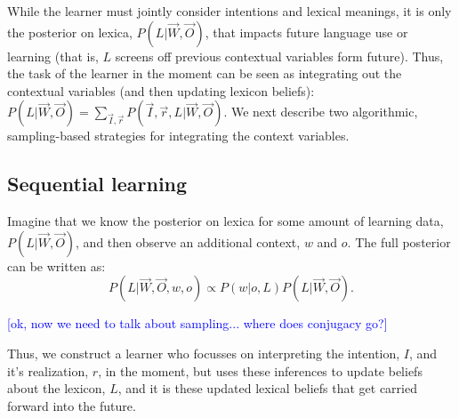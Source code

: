 \documentclass[man,noapacite,12pt]{apa2}
\newcommand{\nnote}[1]{\textcolor{blue}{[#1]}}
\begin{document}
While the learner must jointly consider intentions and lexical meanings, it is only the posterior on lexica, $P(L|\vec{W},\vec{O})$, that impacts future language use or learning (that is, $L$ screens off previous contextual variables form future). Thus, the task of the learner in the moment can be seen as integrating out the contextual variables (and then updating lexicon beliefs): $P(L|\vec{W},\vec{O}) = \sum_{\vec{I}, \vec{r}} P( \vec{I}, \vec{r}, L | \vec{W}, \vec{O})$. We next describe two algorithmic, sampling-based strategies for integrating the context variables.


\subsection{Sequential learning}

Imagine that we know the posterior on lexica for some amount of learning data,  $P(L|\vec{W},\vec{O})$, and then observe an additional context, $w$ and $o$. The full posterior can be written as:
$$
P(L|\vec{W},\vec{O}, w, o) \propto P(w|o,L)P(L|\vec{W},\vec{O}).
$$

\nnote{ok, now we need to talk about sampling... where does conjugacy go?}

Thus, we construct a learner who focusses on interpreting the intention, $I$, and it's realization, $r$, in the moment, but uses these inferences to update beliefs about the lexicon, $L$, and it is these updated lexical beliefs that get carried forward into the future.
\end{document}
